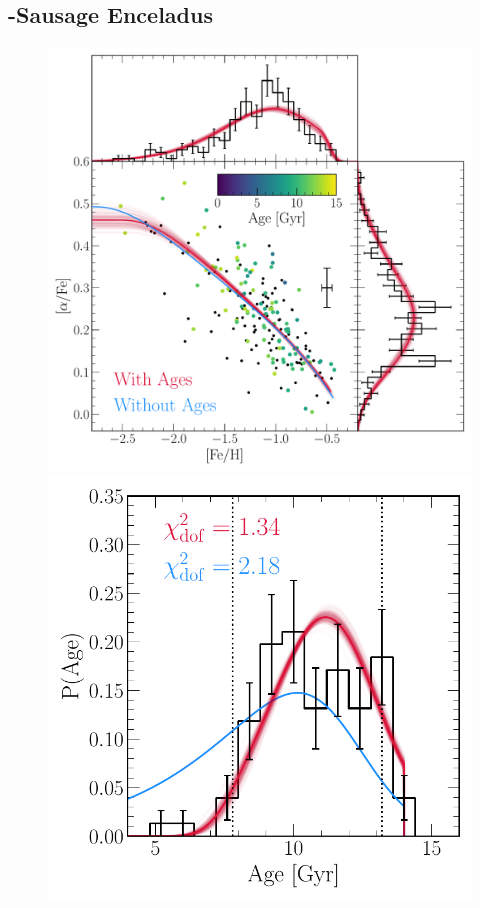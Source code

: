 \documentclass[foo.tex]{subfiles}
\begin{document}
\subsection{\gaia-Sausage Enceladus}
\label{sec:h3:gse}

\begin{figure}
\centering
\includegraphics[scale = 0.65]{gsefit_afe_feh.pdf}
\includegraphics[scale = 0.54]{gsefit_agedist.pdf}

\end{figure}
\end{document}
